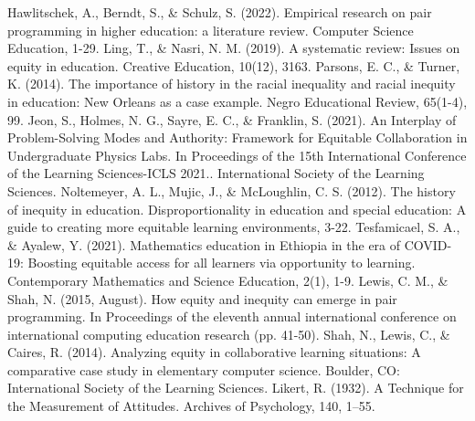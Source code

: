 \documentclass[conference]{IEEEtran}
\begin{document}
\begin{thebibliography}{00}
 Hawlitschek, A., Berndt, S., \& Schulz, S. (2022). Empirical research on pair programming in higher education: a literature review. Computer Science Education, 1-29.
 Ling, T., \& Nasri, N. M. (2019). A systematic review: Issues on equity in education. Creative Education, 10(12), 3163.
 Parsons, E. C., \& Turner, K. (2014). The importance of history in the racial inequality and racial inequity in education: New Orleans as a case example. Negro Educational Review, 65(1-4), 99.
 Jeon, S., Holmes, N. G., Sayre, E. C., \& Franklin, S. (2021). An Interplay of Problem-Solving Modes and Authority: Framework for Equitable Collaboration in Undergraduate Physics Labs. In Proceedings of the 15th International Conference of the Learning Sciences-ICLS 2021.. International Society of the Learning Sciences.
 Noltemeyer, A. L., Mujic, J., \& McLoughlin, C. S. (2012). The history of inequity in education. Disproportionality in education and special education: A guide to creating more equitable learning environments, 3-22.
 Tesfamicael, S. A., \& Ayalew, Y. (2021). Mathematics education in Ethiopia in the era of COVID-19: Boosting equitable access for all learners via opportunity to learning. Contemporary Mathematics and Science Education, 2(1), 1-9.
 Lewis, C. M., \& Shah, N. (2015, August). How equity and inequity can emerge in pair programming. In Proceedings of the eleventh annual international conference on international computing education research (pp. 41-50).
 Shah, N., Lewis, C., \& Caires, R. (2014). Analyzing equity in collaborative learning situations: A comparative case study in elementary computer science. Boulder, CO: International Society of the Learning Sciences.
 Likert, R. (1932). A Technique for the Measurement of Attitudes. Archives of Psychology, 140, 1–55.

\end{thebibliography}
\vspace{12pt}
\end{document}

